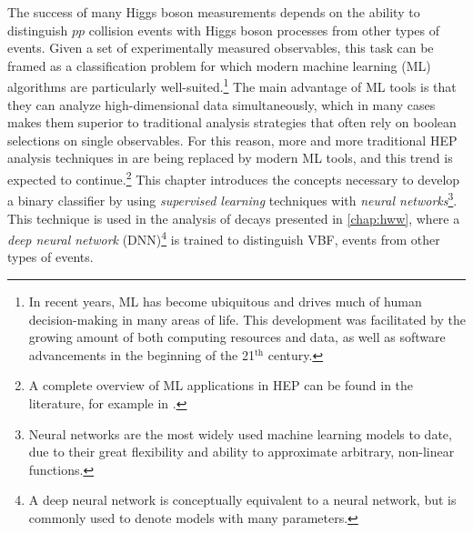 The success of many Higgs boson measurements depends on the ability to distinguish $pp$ collision events with Higgs boson processes from other types of events. Given a set of experimentally measured observables, this task can be framed as a classification problem for which modern machine learning (ML) algorithms are particularly well-suited.\footnote{In recent years, ML has become ubiquitous and drives much of human decision-making in many areas of life. This development was facilitated by the growing amount of both computing resources and data, as well as software advancements in the beginning of the 21$^{\text{th}}$ century.}
The main advantage of ML tools is that they can analyze high-dimensional data simultaneously, which in many cases makes them superior to traditional analysis strategies that often rely on boolean selections on single observables. 
For this reason, more and more traditional HEP analysis techniques in are being replaced by modern ML tools, and this trend is expected to continue.\footnote{A complete overview of ML applications in HEP can be found in the literature, for example in .}
This chapter introduces the concepts necessary to develop a binary classifier by using \emph{supervised learning} techniques with \emph{neural networks}\footnote{Neural networks are the most widely used machine learning models to date, due to their great flexibility and ability to approximate arbitrary, non-linear functions.}.
This technique is used in the analysis of \HWW decays presented in \cref{chap:hww}, where a \emph{deep neural network} (DNN)\footnote{A deep neural network is conceptually equivalent to a neural network, but is commonly used to denote models with many parameters.} is trained to distinguish VBF, \HWW events from other types of events.

